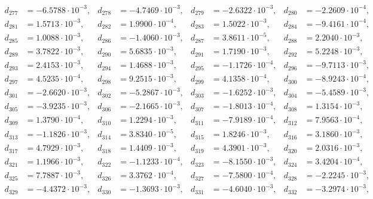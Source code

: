 \begin{align*}
d_{ 277 } &= -6.5788 \cdot 10^{ -3 }, & d_{ 278 } &= -4.7469 \cdot 10^{ -3 }, & d_{ 279 } &= -2.6322 \cdot 10^{ -3 }, & d_{ 280 } &= -2.2609 \cdot 10^{ -4 },\\ 
d_{ 281 } &= 1.5713 \cdot 10^{ -3 }, & d_{ 282 } &= 1.9900 \cdot 10^{ -4 }, & d_{ 283 } &= 1.5022 \cdot 10^{ -3 }, & d_{ 284 } &= -9.4161 \cdot 10^{ -4 },\\ 
d_{ 285 } &= 1.0088 \cdot 10^{ -3 }, & d_{ 286 } &= -1.4060 \cdot 10^{ -3 }, & d_{ 287 } &= 3.8611 \cdot 10^{ -5 }, & d_{ 288 } &= 2.2040 \cdot 10^{ -3 },\\ 
d_{ 289 } &= 3.7822 \cdot 10^{ -3 }, & d_{ 290 } &= 5.6835 \cdot 10^{ -3 }, & d_{ 291 } &= 1.7190 \cdot 10^{ -3 }, & d_{ 292 } &= 5.2248 \cdot 10^{ -3 },\\ 
d_{ 293 } &= 2.4153 \cdot 10^{ -3 }, & d_{ 294 } &= 1.4688 \cdot 10^{ -3 }, & d_{ 295 } &= -1.1726 \cdot 10^{ -4 }, & d_{ 296 } &= -9.7113 \cdot 10^{ -3 },\\ 
d_{ 297 } &= 4.5235 \cdot 10^{ -4 }, & d_{ 298 } &= 9.2515 \cdot 10^{ -3 }, & d_{ 299 } &= 4.1358 \cdot 10^{ -4 }, & d_{ 300 } &= -8.9243 \cdot 10^{ -4 },\\ 
d_{ 301 } &= -2.6620 \cdot 10^{ -3 }, & d_{ 302 } &= -5.2867 \cdot 10^{ -3 }, & d_{ 303 } &= -1.6252 \cdot 10^{ -3 }, & d_{ 304 } &= -5.4589 \cdot 10^{ -3 },\\ 
d_{ 305 } &= -3.9235 \cdot 10^{ -3 }, & d_{ 306 } &= -2.1665 \cdot 10^{ -3 }, & d_{ 307 } &= -1.8013 \cdot 10^{ -4 }, & d_{ 308 } &= 1.3154 \cdot 10^{ -3 },\\ 
d_{ 309 } &= 1.3790 \cdot 10^{ -4 }, & d_{ 310 } &= 1.2294 \cdot 10^{ -3 }, & d_{ 311 } &= -7.9189 \cdot 10^{ -4 }, & d_{ 312 } &= 7.9563 \cdot 10^{ -4 },\\ 
d_{ 313 } &= -1.1826 \cdot 10^{ -3 }, & d_{ 314 } &= 3.8340 \cdot 10^{ -5 }, & d_{ 315 } &= 1.8246 \cdot 10^{ -3 }, & d_{ 316 } &= 3.1860 \cdot 10^{ -3 },\\ 
d_{ 317 } &= 4.7929 \cdot 10^{ -3 }, & d_{ 318 } &= 1.4409 \cdot 10^{ -3 }, & d_{ 319 } &= 4.3901 \cdot 10^{ -3 }, & d_{ 320 } &= 2.0316 \cdot 10^{ -3 },\\ 
d_{ 321 } &= 1.1966 \cdot 10^{ -3 }, & d_{ 322 } &= -1.1233 \cdot 10^{ -4 }, & d_{ 323 } &= -8.1550 \cdot 10^{ -3 }, & d_{ 324 } &= 3.4204 \cdot 10^{ -4 },\\ 
d_{ 325 } &= 7.7887 \cdot 10^{ -3 }, & d_{ 326 } &= 3.3762 \cdot 10^{ -4 }, & d_{ 327 } &= -7.5800 \cdot 10^{ -4 }, & d_{ 328 } &= -2.2245 \cdot 10^{ -3 },\\ 
d_{ 329 } &= -4.4372 \cdot 10^{ -3 }, & d_{ 330 } &= -1.3693 \cdot 10^{ -3 }, & d_{ 331 } &= -4.6040 \cdot 10^{ -3 }, & d_{ 332 } &= -3.2974 \cdot 10^{ -3 },\\ 

\end{align*}
